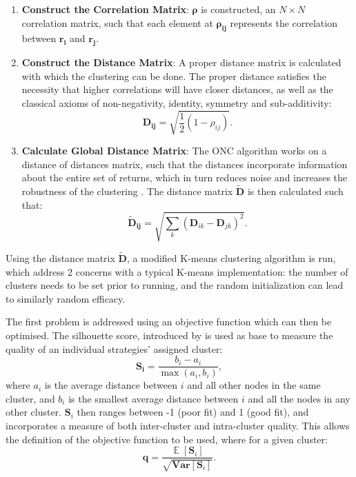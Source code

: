 \documentclass[a4paper,11pt,oneside]{article}
\newcommand{\Var}{\mathbf{Var}}
\DeclareMathOperator*{\E}{\mathbb{E}}
\theoremstyle{plain}
\theoremstyle{definition}
\begin{document}
	\begin{enumerate}
		\item \textbf{Construct the Correlation Matrix}: $\mathbf{\rho}$ is constructed, an $N\times N$ correlation matrix, such that each element at $\mathbf{\rho_{ij}}$ represents the correlation between $\mathbf{r_i}$ and $\mathbf{r_j}$.
		\newline
		\item \textbf{Construct the Distance Matrix}: A proper distance matrix is calculated with which the clustering can be done. The proper distance satisfies the necessity that higher correlations will have closer distances, as well as the classical axioms of non-negativity, identity, symmetry and sub-additivity:
		\begin{equation}
			\mathbf{D_{ij}} = \sqrt{\frac{1}{2}\left(1 - \rho_{ij}\right)} .
		\end{equation} 
		\item \textbf{Calculate Global Distance Matrix}: The ONC algorithm works on a distance of distances matrix, such that the distances incorporate information about the entire set of returns, which in turn reduces noise and increases the robustness of the clustering \citep{LopezPrado2016a}. The distance matrix $\mathbf{\tilde{D}}$ is then calculated such that:
				\begin{equation}
				\mathbf{\tilde{D}_{ij}} = \sqrt{\sum_{k}\left(\mathbf{D}_{ik} - \mathbf{D}_{jk}\right)^2} .
				\end{equation} 
	\end{enumerate}
	
	Using the distance matrix $\mathbf{\tilde{D}}$, a modified K-means clustering algorithm is run, which address 2 concerns with a typical K-means implementation: the number of clusters needs to be set prior to running, and the random initialization can lead to similarly random efficacy. \newline
	
	The first problem is addressed using an objective function which can then be optimised. The silhouette score, introduced by \citet{Rousseeouw1987} is used as base to measure the quality of an individual strategies' assigned cluster:
	\begin{equation}\label{eq_silhouette}
	\mathbf{S_i} = \frac{b_i - a_i}{\mathrm{\max}\left(a_i, b_i\right)} ,
	\end{equation}
	where $a_i$ is the average distance between $i$ and all other nodes in the same cluster, and $b_i$ is the smallest average distance between $i$ and all the nodes in any other cluster. $\mathbf{S}_i$ then ranges between -1 (poor fit) and 1 (good fit), and incorporates a measure of both inter-cluster and intra-cluster quality. This allows the definition of the objective function to be used, where for a given cluster:
	\begin{equation}\label{eq_cluster_q}
	\mathbf{q} = \frac{\E[{\mathbf{S}_i}]}{\sqrt{\Var[{\mathbf{S}_i}]}} .
	\end{equation} 
	
\end{document}
